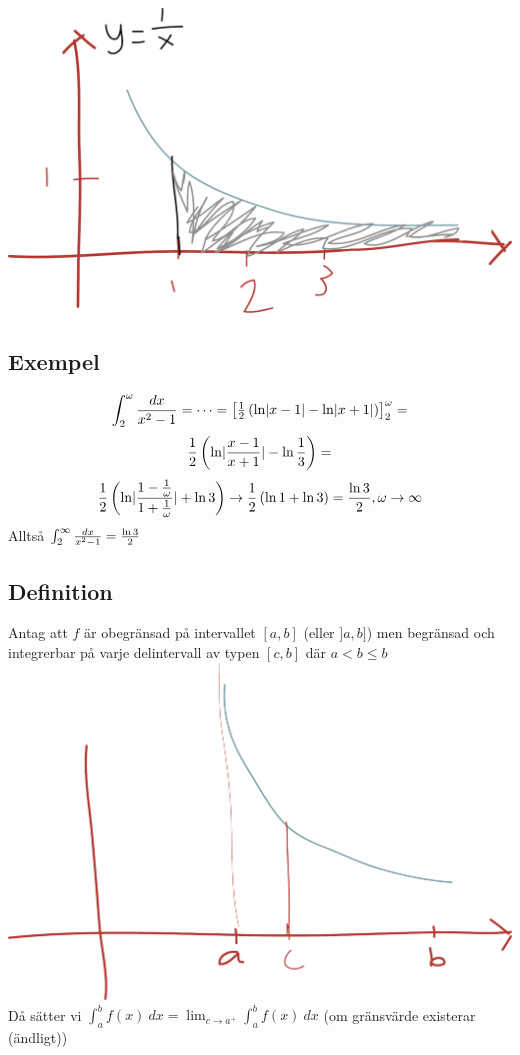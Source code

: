 \documentclass{article}
\begin{document}
\includegraphics[scale=0.25]{img/img11.pdf}

\subsection{Exempel}
$$ \int^\omega_2{dx \over x^2-1} = \dots = \left[\begin{matrix}\frac{1}{2} \left(\ln\lvert x-1\rvert - \ln\lvert x+1\rvert\right)\end{matrix}\right]^\omega_2 = $$
$$ \frac{1}{2} \left(\ln\lvert\frac{x-1}{x+1}\rvert - \ln\frac{1}{3}\right) =$$
$$ \frac{1}{2} \left(\ln\lvert\frac{1-\frac{1}{\omega}}{1+\frac{1}{\omega}}\rvert + \ln 3\right) \to \frac{1}{2} \left(\ln 1 + \ln 3\right) = \frac{\ln 3}{2}, \omega \to \infty$$
Alltså
$\int^\infty_2{dx \over x^2-1} = \frac{\ln 3}{2}$

\subsection{Definition}
Antag att $f$ är obegränsad på intervallet $[a,b]$ (eller $]a,b]$) men begränsad och integrerbar på varje delintervall av typen $[c,b]$ där $a<b\le b$\\
\includegraphics[scale=0.25]{img/img12.pdf}\\
Då sätter vi $\int^b_a{f(x)\ dx} = \lim_{c\to a^+} \int^b_a{f(x)\ dx}$ (om gränsvärde existerar (ändligt))
\end{document}
